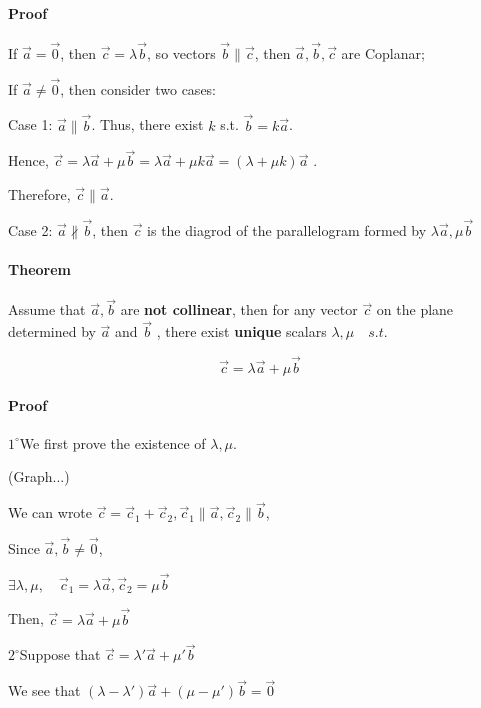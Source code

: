 \documentclass[UTF8]{ctexart}
\begin{document}
\paragraph{Proof}

If $\vec a  = \vec 0$, then $\vec c = \lambda \vec  b$, so vectors $\vec  b \parallel \vec  c$, then $\vec  a, \vec  b, \vec  c $ are Coplanar;

If $\vec  a \neq \vec  0 $, then consider two cases:

Case 1: $\vec  a \parallel \vec  b$. Thus, there exist $k$ s.t. $\vec  b = k \vec  a $. 

Hence, $\vec  c = \lambda \vec  a + \mu \vec  b = \lambda \vec  a +\mu k \vec  a  = (\lambda + \mu k ) \vec  a $ .

Therefore, $\vec c \parallel \vec  a$. 

Case 2: $\vec  a \not \parallel \vec  b$, then $\vec  c$ is the diagrod of the parallelogram formed by $\lambda \vec  a, \mu \vec  b$

\paragraph{Theorem}

Assume that $\vec a, \vec b $ are \textbf{not collinear}, then for any vector $\vec c $  on the plane determined by $\vec a$ and $\vec b $ , there exist \textbf{unique} scalars $\lambda , \mu \quad s.t. \quad $


$$
\vec c = \lambda \vec a + \mu \vec b
$$

\paragraph{Proof}

$1^{\circ}$We first prove the existence of $\lambda, \mu $. 

(Graph...)

We can wrote $\vec c = \vec  c_1+ \vec  c_2, \vec c_1 \parallel \vec a, \vec c_2 \parallel \vec  b$, 

Since $\vec a,\vec  b \neq \vec  0$, 

$\exists \lambda,\mu,\quad \vec c_1 = \lambda \vec a, \vec c_2 = \mu \vec b$

Then, $\vec c = \lambda \vec  a+\mu \vec  b$

$2^{\circ}$Suppose that $\vec c = \lambda ' \vec  a+\mu '\vec  b $

We see that $(\lambda - \lambda ')\vec  a +(\mu - \mu ')\vec b  = \vec  0$
\end{document}
